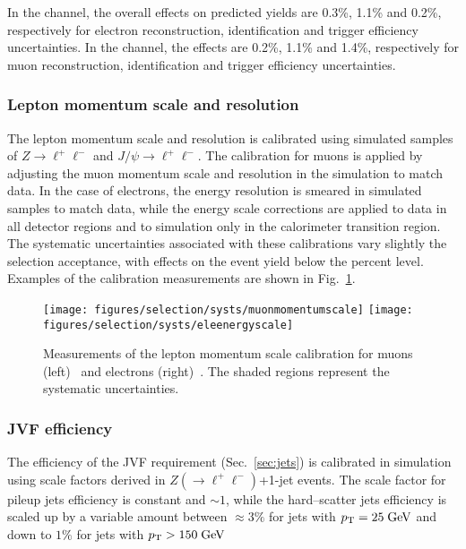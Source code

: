 In the \ejets{} channel, the overall effects on predicted yields are 0.3\%, 1.1\% 
and 0.2\%, respectively for electron reconstruction, identification
and trigger efficiency uncertainties.
In the \mujets{} channel, the effects are 0.2\%, 1.1\% and 1.4\%,
respectively for muon reconstruction, identification and trigger
efficiency uncertainties.

\subsubsection{Lepton momentum scale and resolution}
\label{sec:lepscale}

The lepton momentum scale and resolution is calibrated using
simulated samples of $Z\to \ell^+\ell^-$ and $J/\psi \to
\ell^+\ell^-$.
The calibration for muons is applied by adjusting the muon momentum
scale and resolution in the simulation to match data. In the case of
electrons, the energy resolution is smeared in simulated samples to
match data, while the energy scale corrections are applied to data in
all detector regions and to simulation only in the calorimeter
transition region. 
The systematic uncertainties associated with these calibrations vary
slightly the selection acceptance, with effects on the event yield
below the percent level. Examples of the calibration measurements are
shown in Fig.~\ref{fig:lepscalesyst}.

\begin{figure}\centering
  \texttt{[image: figures/selection/systs/muonmomentumscale]}
  \texttt{[image: figures/selection/systs/eleenergyscale]}
  \caption{
    Measurements of the lepton momentum scale calibration for muons
    (left)~\cite{Sforza:1529999} and electrons
    (right)~\cite{Aad:2014nim}. The shaded regions represent the
    systematic uncertainties. 
  }
  \label{fig:lepscalesyst}
\end{figure}

\subsubsection{JVF efficiency}
\label{sec:syst_jvf}

The efficiency of the JVF requirement (Sec.~\ref{sec:jets}) is
calibrated in simulation using scale factors derived in $Z(\to
\ell^+\ell^-)$+1-jet events. The scale factor for pileup jets efficiency is
constant and $\sim1$, while the hard--scatter jets efficiency is
scaled up by a variable amount between $\approx3\%$ for jets with
$p_{\mathrm{T}}{}=25\; \mathrm{GeV}{}$ and down to $1\%$ for jets with $p_{\mathrm{T}}{}>150\; \mathrm{GeV}{}$

